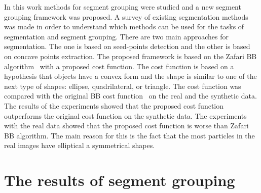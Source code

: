 \documentclass{lutmscthesis}[2010/09/22]
\begin{document}
In this work methods for segment grouping were studied and a new segment grouping framework was proposed. A survey of existing segmentation methods was made in order to understand which methods can be used for the tasks of segmentation and segment grouping. There are two main approaches for segmentation. The one is based on seed-points detection and the other is based on concave points extraction. The proposed framework is based on the Zafari BB algorithm~\cite{zafari-bb} with a proposed cost function. The cost function is based on a hypothesis that objects have a convex form and the shape is similar to one of the next type of shapes: ellipse, quadrilateral, or triangle.
The cost function was compared with the original BB cost function~\cite{zafari-bb} on the real and the synthetic data. The results of the experiments showed that the proposed cost function outperforms the original cost function on the synthetic data. The experiments with the real data showed that the proposed cost function is worse than Zafari BB algorithm. The main reason for this is the fact that the most particles in the real images have elliptical a symmetrical shapes.

\clearpage

%





\appendix
 
\section{The results of segment grouping}
\label{appendix:graph}


\newlength{\tempdima}
\newcommand{\rowname}[1]%
{\rotatebox{90}{\makebox[\tempdima][c]{\textbf{#1}}}}

\renewcommand{\thesubfigure}{\alph{subfigure}}
\newcommand{\mycaption}[1]%
{\refstepcounter{subfigure}\textbf{(\thesubfigure) }{\ignorespaces #1}}
\end{document}
